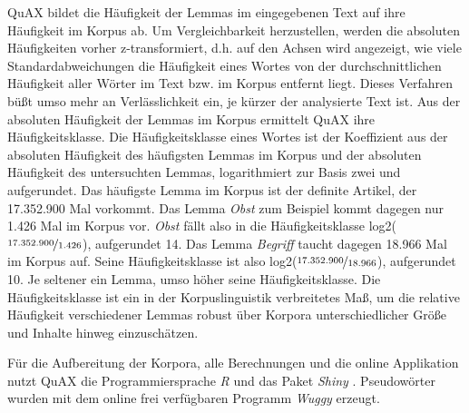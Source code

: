 \documentclass[11pt]{article}\usepackage[]{graphicx}\usepackage[]{color}
\begin{document}
QuAX bildet die Häufigkeit der Lemmas im eingegebenen Text auf ihre Häufigkeit im Korpus ab. Um Vergleichbarkeit herzustellen, werden die absoluten Häufigkeiten vorher z-transformiert, d.h. auf den Achsen wird angezeigt, wie viele Standardabweichungen die Häufigkeit eines Wortes von der durchschnittlichen Häufigkeit aller Wörter im Text bzw. im Korpus entfernt liegt. Dieses Verfahren büßt umso mehr an Verlässlichkeit ein, je kürzer der analysierte Text ist. Aus der absoluten Häufigkeit der Lemmas im Korpus ermittelt QuAX ihre Häufigkeitsklasse. Die Häufigkeitsklasse eines Wortes ist der Koeffizient aus der absoluten Häufigkeit des häufigsten Lemmas im Korpus und der absoluten Häufigkeit des untersuchten Lemmas, logarithmiert zur Basis zwei und aufgerundet. Das häufigste Lemma im Korpus ist der definite Artikel, der 17.352.900 Mal vorkommt. Das Lemma \textit{Obst} zum Beispiel kommt dagegen nur 1.426 Mal im Korpus vor. \textit{Obst} fällt also in die Häufigkeitsklasse log2($\nicefrac{17.352.900}{1.426}$), aufgerundet 14. Das Lemma \textit{Begriff} taucht dagegen 18.966 Mal im Korpus auf. Seine Häufigkeitsklasse ist also log2($\nicefrac{17.352.900}{18.966}$), aufgerundet 10. Je seltener ein Lemma, umso höher seine Häufigkeitsklasse. Die Häufigkeitsklasse ist ein in der Korpuslinguistik verbreitetes Maß, um die relative Häufigkeit verschiedener Lemmas robust über Korpora unterschiedlicher Größe und Inhalte hinweg einzuschätzen. 

Für die Aufbereitung der Korpora, alle Berechnungen und die online Applikation nutzt QuAX die Programmiersprache \textit{R} \parencite{RCT.2013} und das Paket \textit{Shiny} \parencite{Chang.2017}. Pseudowörter wurden mit dem online frei verfügbaren Programm \textit{Wuggy} \parencite{Keuleers.2010} erzeugt.


\newpage 

\printbibliography[title=Literatur]
\end{document}
